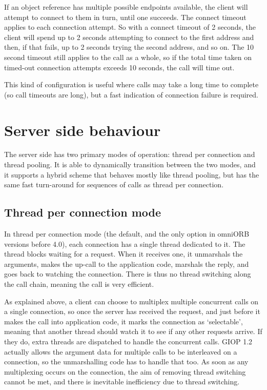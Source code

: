 \documentclass[11pt,twoside,a4paper]{book}
\begin{document}
If an object reference has multiple possible endpoints available, the
client will attempt to connect to them in turn, until one succeeds.
The connect timeout applies to each connection attempt. So with a
connect timeout of 2 seconds, the client will spend up to 2 seconds
attempting to connect to the first address and then, if that fails, up
to 2 seconds trying the second address, and so on. The 10 second
timeout still applies to the call as a whole, so if the total time
taken on timed-out connection attempts exceeds 10 seconds, the call
will time out.

This kind of configuration is useful where calls may take a long time
to complete (so call timeouts are long), but a fast indication of
connection failure is required.


\section{Server side behaviour}

The server side has two primary modes of operation: thread per
connection and thread pooling. It is able to dynamically transition
between the two modes, and it supports a hybrid scheme that behaves
mostly like thread pooling, but has the same fast turn-around for
sequences of calls as thread per connection.

\subsection{Thread per connection mode}

In thread per connection mode (the default, and the only option in
omniORB versions before 4.0), each connection has a single thread
dedicated to it. The thread blocks waiting for a request. When it
receives one, it unmarshals the arguments, makes the up-call to the
application code, marshals the reply, and goes back to watching the
connection. There is thus no thread switching along the call chain,
meaning the call is very efficient.

As explained above, a client can choose to multiplex multiple
concurrent calls on a single connection, so once the server has
received the request, and just before it makes the call into
application code, it marks the connection as `selectable', meaning
that another thread should watch it to see if any other requests
arrive. If they do, extra threads are dispatched to handle the
concurrent calls. GIOP 1.2 actually allows the argument data for
multiple calls to be interleaved on a connection, so the unmarshalling
code has to handle that too. As soon as any multiplexing occurs on the
connection, the aim of removing thread switching cannot be met, and
there is inevitable inefficiency due to thread switching.
\end{document}
